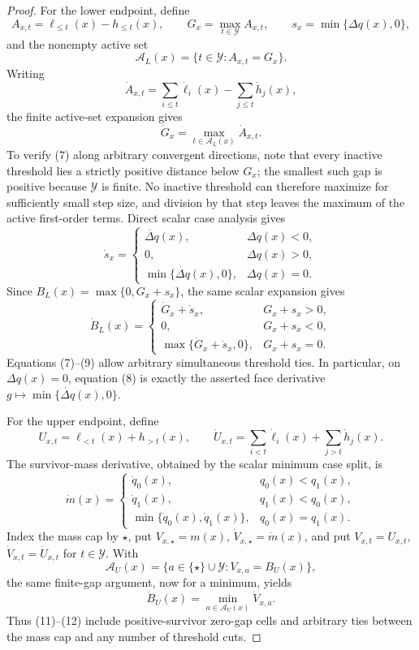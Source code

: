 \documentclass{article}
\begin{document}
\begin{proof}
For the lower endpoint, define
\[
A_{x,t}=\ell_{\le t}(x)-h_{\le t}(x),\qquad
G_x=\max_{t\in\mathcal Y}A_{x,t},\qquad
s_x=\min\{\Delta q(x),0\},
\tag{6}
\]
and the nonempty active set
\[
\mathcal A_L(x)=\{t\in\mathcal Y:A_{x,t}=G_x\}.
\]
Writing
\[
\dot A_{x,t}=\sum_{i\le t}\dot\ell_i(x)
-\sum_{j\le t}\dot h_j(x),
\]
the finite active-set expansion gives
\[
\dot G_x=\max_{t\in\mathcal A_L(x)}\dot A_{x,t}.
\tag{7}
\]
To verify (7) along arbitrary convergent directions, note that every
inactive threshold lies a strictly positive distance below \(G_x\); the
smallest such gap is positive because \(\mathcal Y\) is finite.  No
inactive threshold can therefore maximize for sufficiently small step
size, and division by that step leaves the maximum of the active
first-order terms.  Direct scalar case analysis gives
\[
\dot s_x=
\begin{cases}
\dot{\Delta q}(x),&\Delta q(x)<0,\\
0,&\Delta q(x)>0,\\
\min\{\dot{\Delta q}(x),0\},&\Delta q(x)=0.
\end{cases}
\tag{8}
\]
Since \(B_L(x)=\max\{0,G_x+s_x\}\), the same scalar expansion gives
\[
\dot B_L(x)=
\begin{cases}
\dot G_x+\dot s_x,&G_x+s_x>0,\\
0,&G_x+s_x<0,\\
\max\{\dot G_x+\dot s_x,0\},&G_x+s_x=0.
\end{cases}
\tag{9}
\]
Equations (7)--(9) allow arbitrary simultaneous threshold ties.  In
particular, on \(\Delta q(x)=0\), equation (8) is exactly the asserted
face derivative \(g\mapsto\min\{\dot{\Delta q}(x),0\}\).

For the upper endpoint, define
\[
U_{x,t}=\ell_{<t}(x)+h_{>t}(x),
\qquad
\dot U_{x,t}=\sum_{i<t}\dot\ell_i(x)+\sum_{j>t}\dot h_j(x).
\tag{10}
\]
The survivor-mass derivative, obtained by the scalar minimum case split,
is
\[
\dot m(x)=
\begin{cases}
\dot q_0(x),&q_0(x)<q_1(x),\\
\dot q_1(x),&q_1(x)<q_0(x),\\
\min\{\dot q_0(x),\dot q_1(x)\},&q_0(x)=q_1(x).
\end{cases}
\tag{11}
\]
Index the mass cap by \(\star\), put
\(V_{x,\star}=m(x)\), \(\dot V_{x,\star}=\dot m(x)\), and put
\(V_{x,t}=U_{x,t}\), \(\dot V_{x,t}=\dot U_{x,t}\) for
\(t\in\mathcal Y\).  With
\[
\mathcal A_U(x)=
\{a\in\{\star\}\cup\mathcal Y:V_{x,a}=B_U(x)\},
\]
the same finite-gap argument, now for a minimum, yields
\[
\dot B_U(x)=\min_{a\in\mathcal A_U(x)}\dot V_{x,a}.
\tag{12}
\]
Thus (11)--(12) include positive-survivor zero-gap cells and arbitrary
ties between the mass cap and any number of threshold cuts.


\end{proof}
\end{document}
